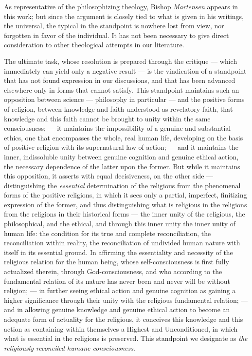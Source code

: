\documentclass[12pt,a4paper]{book}
\begin{document}
As representative of the philosophizing theology, Bishop \emph{Martensen}
appears in this work; but since the argument is closely tied to what
is given in his writings, the universal, the typical in the standpoint
is nowhere lost from view, nor forgotten in favor of the individual.
It has not been necessary to give direct consideration to other
theological attempts in our literature.

The ultimate task, whose resolution is prepared through the critique
--- which immediately can yield only a negative result --- is the
vindication of a standpoint that has not found expression in our
discussions, and that has been advanced elsewhere only in forms that
cannot satisfy. This standpoint maintains such an opposition between
science --- philosophy in particular --- and the positive forms of
religion, between knowledge and faith understood as revelatory faith,
that knowledge and this faith cannot be brought to unity within the
same consciousness; --- it maintains the impossibility of a genuine
and substantial ethics, one that encompasses the whole, real human
life, developing on the basis of positive religion with its
supernatural law of action; --- and it maintains the inner,
indissoluble unity between genuine cognition and genuine ethical
action, the necessary dependence of the latter upon the former. But
while it maintains this opposition, it asserts with equal
decisiveness, on the other side --- distinguishing the \emph{essential}
determination of the religious from the phenomenal forms of the
positive religions, in which it sees only a partial, imperfect,
finitizing expression of the former, and thus distinguishing what is
religious in the religions from the religions in their historical
forms --- the inner unity of the religious, the philosophical, and the
ethical, and through this inner unity the inner unity of human life:
the condition for its true and complete reconciliation, the
reconciliation within reality, the reconciliation of undivided human
nature with itself in its essential ground. In affirming the
essentiality and necessity of the religious relation for the human
being, whose self-consciousness is first fully actualized therein,
through God-consciousness, and who according to the fundamental
relation of its nature has never been and never will be without
religion; --- in further seeing ethical action and genuine cognition as
gaining a higher significance through their unity with the religious
fundamental relation; --- and in allowing genuine knowledge and genuine
ethical action to become an adequate form of actuality for the
religious, it conceives this knowledge and this action as containing
within themselves a Highest and Unconditioned, in which what is
essential in the religions is preserved. This standpoint we designate
as \emph{the religiously reconciled humane consciousness}.
\end{document}
